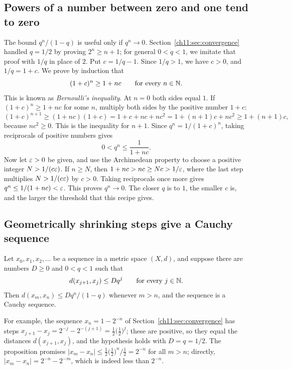 \subsection*{Powers of a number between zero and one tend to zero}
The bound $q^n/(1-q)$ is useful only if $q^n\to0$. Section~\ref{ch11:sec:convergence} handled $q=1/2$ by proving $2^n\ge n+1$; for general $0<q<1$, we imitate that proof with $1/q$ in place of $2$. Put $c=1/q-1$. Since $1/q>1$, we have $c>0$, and $1/q=1+c$. We prove by induction that
\[
(1+c)^n\ge1+nc\qquad\text{for every }n\in\mathbb N.
\]
This is known as \emph{Bernoulli's inequality}. At $n=0$ both sides equal $1$. If $(1+c)^n\ge1+nc$ for some $n$, multiply both sides by the positive number $1+c$:
\[
 (1+c)^{n+1}\ge(1+nc)(1+c)
 =1+c+nc+nc^2=1+(n+1)c+nc^2\ge1+(n+1)c,
\]
because $nc^2\ge0$. This is the inequality for $n+1$. Since $q^n=1/(1+c)^n$, taking reciprocals of positive numbers gives
\[
 0<q^n\le\frac1{1+nc}.
\]
Now let $\varepsilon>0$ be given, and use the Archimedean property to choose a positive integer $N>1/(c\varepsilon)$. If $n\ge N$, then $1+nc>nc\ge Nc>1/\varepsilon$, where the last step multiplies $N>1/(c\varepsilon)$ by $c>0$. Taking reciprocals once more gives $q^n\le1/(1+nc)<\varepsilon$. This proves $q^n\to0$. The closer $q$ is to $1$, the smaller $c$ is, and the larger the threshold that this recipe gives.

\subsection*{Geometrically shrinking steps give a Cauchy sequence}
\par\noindent\begin{minipage}{\linewidth}
\begin{proposition}\label{ch11:prop:geometric-cauchy}
Let $x_0,x_1,x_2,\ldots$ be a sequence in a metric space $(X,d)$, and suppose there are numbers $D\ge0$ and $0<q<1$ such that
\[
d(x_{j+1},x_j)\le Dq^j\qquad\text{for every }j\in\mathbb N.
\]
Then $d(x_m,x_n)\le Dq^n/(1-q)$ whenever $m>n$, and the sequence is a Cauchy sequence.
\end{proposition}
\end{minipage}\par

For example, the sequence $x_n=1-2^{-n}$ of Section~\ref{ch11:sec:convergence} has steps $x_{j+1}-x_j=2^{-j}-2^{-(j+1)}=\tfrac12\bigl(\tfrac12\bigr)^j$; these are positive, so they equal the distances $d(x_{j+1},x_j)$, and the hypothesis holds with $D=q=1/2$. The proposition promises $|x_m-x_n|\le\tfrac12\bigl(\tfrac12\bigr)^n\big/\tfrac12=2^{-n}$ for all $m>n$; directly, $|x_m-x_n|=2^{-n}-2^{-m}$, which is indeed less than $2^{-n}$.

